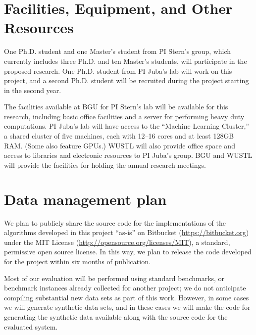 \documentclass[12pt]{article}
\newcommand{\note}[1]{\textbf{\textit{#1}}}
\begin{document}
\section*{Facilities, Equipment, and Other Resources}


One Ph.D. student and one Master’s student from PI Stern's group, which currently includes three Ph.D. and ten Master's students, will participate in the proposed research. One Ph.D. student from PI Juba's lab will work on this project, and a second Ph.D. student will be recruited during the project starting in the second year.

The facilities available at BGU for PI Stern's
lab will be available for this research, including basic office facilities and a server for performing heavy duty computations. PI Juba's lab will have access to the ``Machine Learning Cluster,'' a  shared cluster of five machines, each with 12--16 cores and at least 128GB RAM. (Some also feature GPUs.) WUSTL will also provide office space and access to libraries and electronic resources to PI Juba's group. BGU and WUSTL will provide the facilities for holding the annual research meetings. 

\newpage
\section*{Data management plan}
We plan to publicly share the source code for the implementations of the algorithms developed in this project ``as-is'' on Bitbucket (\url{https://bitbucket.org}) under the MIT License (\url{http://opensource.org/licenses/MIT}), a standard, permissive open source license. In this way, we plan to release the code developed for the project within six months of publication.

Most of our evaluation will be performed using standard benchmarks, or benchmark instances already collected for another project; we do not anticipate compiling substantial new data sets as part of this work. However, in some cases we will generate synthetic data sets, and in these cases we will make the code for generating the synthetic data available along with the source code for the evaluated system. 
\end{document}
